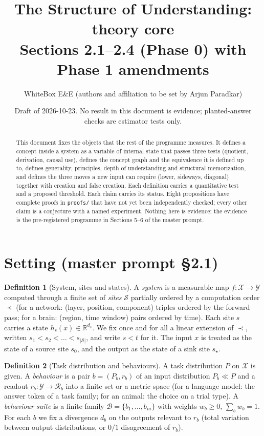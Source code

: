 \documentclass[11pt]{article}
\title{The Structure of Understanding: theory core\\[2pt]
\large Sections 2.1--2.4 (Phase 0) with Phase 1 amendments}
\author{WhiteBox E\&E (authors and affiliation to be set by Arjun Paradkar)}
\date{Draft of 2026-10-23. No result in this document is evidence; planted-answer checks are estimator tests only.}
\theoremstyle{definition}
\newtheorem{definition}{Definition}[section]
\theoremstyle{plain}
\theoremstyle{remark}
\newcommand{\X}{\mathcal{X}}
\newcommand{\Y}{\mathcal{Y}}
\newcommand{\B}{\mathcal{B}}
\newcommand{\Sites}{\mathcal{S}}
\begin{document}
\sloppy
\maketitle

\begin{abstract}
This document fixes the objects that the rest of the programme measures. It
defines a concept inside a system as a variable of internal state that passes
three tests (quotient, derivation, causal use), defines the concept graph and
the equivalence it is defined up to, defines generality, principles, depth of
understanding and structural memorization, and defines the three moves a new
input can require (lower, sideways, diagonal) together with creation and false
creation. Each definition carries a quantitative test and a proposed threshold.
Each claim carries its status. Eight propositions have complete proofs in
\texttt{proofs/} that have not yet been independently checked; every other
claim is a conjecture with a named experiment. Nothing here is evidence; the
evidence is the pre-registered programme in Sections 5--6 of the master
prompt.
\end{abstract}

\tableofcontents

\section{Setting (master prompt \S2.1)}

\begin{definition}[System, sites and states]\label{def:system}
A \emph{system} is a measurable map $f\colon\X\to\Y$ computed through a finite
set of \emph{sites} $\Sites$ partially ordered by a computation order
$\prec$ (for a network: (layer, position, component) triples ordered by the
forward pass; for a brain: (region, time window) pairs ordered by time).
Each site $s$ carries a state $h_s(x)\in\mathbb{R}^{d_s}$. We fix once and for
all a linear extension of $\prec$, written $s_1<s_2<\dots<s_{|\Sites|}$, and
write $s<t$ for it. The input $x$ is treated as the state of a source site
$s_0$, and the output as the state of a sink site $s_\star$.
\end{definition}

\begin{definition}[Task distribution and behaviours]\label{def:behaviour}
A task distribution $P$ on $\X$ is given. A \emph{behaviour} is a pair
$b=(P_b,r_b)$ of an input distribution $P_b\ll P$ and a readout
$r_b\colon\Y\to\mathcal{R}_b$ into a finite set or a metric space (for a
language model: the answer token of a task family; for an animal: the choice
on a trial type). A \emph{behaviour suite} is a finite family
$\B=\{b_1,\dots,b_m\}$ with weights $w_b\ge0$, $\sum_b w_b=1$. For each $b$ we
fix a divergence $d_b$ on the outputs relevant to $r_b$ (total variation
between output distributions, or $0/1$ disagreement of $r_b$).
\end{definition}
\end{document}
